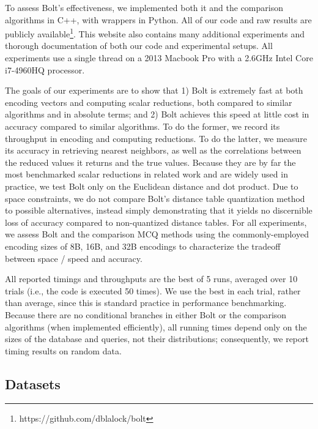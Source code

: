 
To assess Bolt's effectiveness, we implemented both it and the comparison algorithms in C++, with wrappers in Python. All of our code and raw results are publicly available\footnote{https://github.com/dblalock/bolt}. This website also contains many additional experiments and thorough documentation of both our code and experimental setups. All experiments use a single thread on a 2013 Macbook Pro with a 2.6GHz Intel Core i7-4960HQ processor. %

The goals of our experiments are to show that 1) Bolt is extremely fast at both encoding vectors and computing scalar reductions, both compared to similar algorithms and in absolute terms; and 2) Bolt achieves this speed at little cost in accuracy compared to similar algorithms. To do the former, we record its throughput in encoding and computing reductions. To do the latter, we measure its accuracy in retrieving nearest neighbors, as well as the correlations between the reduced values it returns and the true values. Because they are by far the most benchmarked scalar reductions in related work and are widely used in practice, we test Bolt only on the Euclidean distance and dot product. Due to space constraints, we do not compare Bolt's distance table quantization method to possible alternatives, instead simply demonstrating that it yields no discernible loss of accuracy compared to non-quantized distance tables. For all experiments, we assess Bolt and the comparison MCQ methods using the commonly-employed encoding sizes of 8B, 16B, and 32B encodings to characterize the tradeoff between space / speed and accuracy.

All reported timings and throughputs are the best of 5 runs, averaged over 10 trials (i.e., the code is executed 50 times). We use the best in each trial, rather than average, since this is standard practice in performance benchmarking. Because there are no conditional branches in either Bolt or the comparison algorithms (when implemented efficiently), all running times depend only on the sizes of the database and queries, not their distributions; consequently, we report timing results on random data.

\subsection{Datasets}

